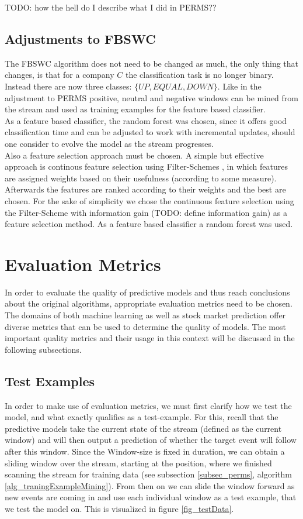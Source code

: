  TODO: how the hell do I describe what I did in PERMS??

\subsection{Adjustments to FBSWC}
The FBSWC algorithm does not need to be changed as much, the only thing that changes, is that for a company $C$ the classification task is no longer binary. Instead there are now three classes: $\{UP,EQUAL,DOWN\}$. Like in the adjustment to PERMS positive, neutral and negative windows can be mined from the stream and used as training examples for the feature based classifier. \\
As a feature based classifier, the random forest was chosen, since it offers good classification time and can be adjusted to work with incremental updates, should one consider to evolve the model as the stream progresses.\\
Also a feature selection approach must be chosen. A simple but effective approach is continous feature selection using Filter-Schemes \cite{molina2002feature}, in which features are assigned weights based on their usefulness (according to some measure). Afterwards the features are ranked according to their weights and the best are chosen. For the sake of simplicity we chose the continuous feature selection using the Filter-Scheme with information gain (TODO: define information gain) as a feature selection method. As a feature based classifier a random forest was used.

\section{Evaluation Metrics}
\label{sec_evaluationMetrics}

In order to evaluate the quality of predictive models and thus reach conclusions about the original algorithms, appropriate evaluation metrics need to be chosen. The domains of both machine learning as well as stock market prediction offer diverse metrics that can be used to determine the quality of models. The most important quality metrics and their usage in this context will be discussed in the following subsections.

\subsection{Test Examples}
In order to make use of evaluation metrics, we must first clarify how we test the model, and what exactly qualifies as a test-example. For this, recall that the predictive models take the current state of the stream (defined as the current window) and will then output a prediction of whether the target event will follow after this window. Since the Window-size is fixed in duration, we can obtain a sliding window over the stream, starting at the position, where we finished scanning the stream for training data (see subsection \ref{subsec_perms}, algorithm \ref{alg_traningExampleMining}). From then on we can slide the window forward as new events are coming in and use each individual window as a test example, that we test the model on. This is visualized in figure \ref{fig_testData}.

